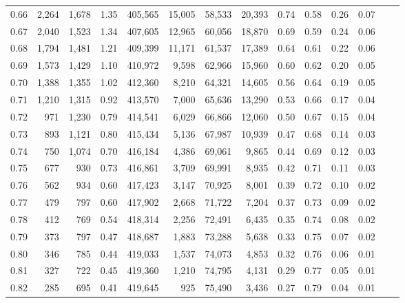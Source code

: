 \begin{tabular}{rrrrrrrrrrrrrr}
0.66 &   2,264 &  1,678 &    1.35 &  405,565 &   15,005 &  58,533 &  20,393 &  0.74 &  0.58 &  0.26 &      0.07 \\
0.67 &   2,040 &  1,523 &    1.34 &  407,605 &   12,965 &  60,056 &  18,870 &  0.69 &  0.59 &  0.24 &      0.06 \\
0.68 &   1,794 &  1,481 &    1.21 &  409,399 &   11,171 &  61,537 &  17,389 &  0.64 &  0.61 &  0.22 &      0.06 \\
0.69 &   1,573 &  1,429 &    1.10 &  410,972 &    9,598 &  62,966 &  15,960 &  0.60 &  0.62 &  0.20 &      0.05 \\
0.70 &   1,388 &  1,355 &    1.02 &  412,360 &    8,210 &  64,321 &  14,605 &  0.56 &  0.64 &  0.19 &      0.05 \\
0.71 &   1,210 &  1,315 &    0.92 &  413,570 &    7,000 &  65,636 &  13,290 &  0.53 &  0.66 &  0.17 &      0.04 \\
0.72 &     971 &  1,230 &    0.79 &  414,541 &    6,029 &  66,866 &  12,060 &  0.50 &  0.67 &  0.15 &      0.04 \\
0.73 &     893 &  1,121 &    0.80 &  415,434 &    5,136 &  67,987 &  10,939 &  0.47 &  0.68 &  0.14 &      0.03 \\
0.74 &     750 &  1,074 &    0.70 &  416,184 &    4,386 &  69,061 &   9,865 &  0.44 &  0.69 &  0.12 &      0.03 \\
0.75 &     677 &    930 &    0.73 &  416,861 &    3,709 &  69,991 &   8,935 &  0.42 &  0.71 &  0.11 &      0.03 \\
0.76 &     562 &    934 &    0.60 &  417,423 &    3,147 &  70,925 &   8,001 &  0.39 &  0.72 &  0.10 &      0.02 \\
0.77 &     479 &    797 &    0.60 &  417,902 &    2,668 &  71,722 &   7,204 &  0.37 &  0.73 &  0.09 &      0.02 \\
0.78 &     412 &    769 &    0.54 &  418,314 &    2,256 &  72,491 &   6,435 &  0.35 &  0.74 &  0.08 &      0.02 \\
0.79 &     373 &    797 &    0.47 &  418,687 &    1,883 &  73,288 &   5,638 &  0.33 &  0.75 &  0.07 &      0.02 \\
0.80 &     346 &    785 &    0.44 &  419,033 &    1,537 &  74,073 &   4,853 &  0.32 &  0.76 &  0.06 &      0.01 \\
0.81 &     327 &    722 &    0.45 &  419,360 &    1,210 &  74,795 &   4,131 &  0.29 &  0.77 &  0.05 &      0.01 \\
0.82 &     285 &    695 &    0.41 &  419,645 &      925 &  75,490 &   3,436 &  0.27 &  0.79 &  0.04 &      0.01 \\

\end{tabular}
